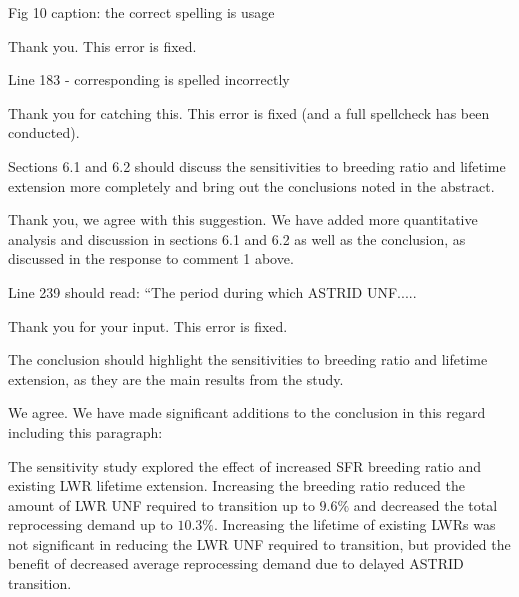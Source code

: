 \documentclass[answers,11pt]{exam}
\begin{document}
\begin{questions}
        \question Fig 10 caption: the correct spelling is usage

        \begin{solution}
                Thank you. This error is fixed.
        \end{solution}

        \question Line 183 - corresponding is spelled incorrectly
        \begin{solution}
                Thank you for catching this. This error is fixed 
                (and a full spellcheck has been conducted).
        \end{solution}

        \question Sections 6.1 and 6.2 should discuss the sensitivities to 
        breeding ratio and lifetime extension more completely and bring out the 
        conclusions noted in the abstract.

        \begin{solution}
                Thank you, we agree with this suggestion. We have added more quantitative
		analysis and discussion in sections 6.1 and 6.2 as well as the
		conclusion, as discussed in the response to comment 1 above.
        \end{solution}

        \question Line 239 should read: ``The period during which ASTRID UNF.....
        \begin{solution}
                Thank you for your input. This error is fixed.
        \end{solution}

        \question The conclusion should highlight the sensitivities to breeding 
        ratio and lifetime extension, as they are the main results from the 
        study.  

        \begin{solution}
                We agree. We have made significant additions to the conclusion 
                in this regard including this paragraph:


The sensitivity study explored the effect of increased \gls{SFR} breeding
ratio and existing \gls{LWR} lifetime extension. Increasing the breeding
ratio reduced the amount of \gls{LWR} \gls{UNF} required to transition
up to $9.6\%$ and decreased the total reprocessing demand up to $10.3\%$.
Increasing the lifetime of existing \glspl{LWR} was not significant
in reducing the \gls{LWR} \gls{UNF} required to transition, but provided the benefit of
decreased average reprocessing demand due to delayed \gls{ASTRID} transition.


\end{solution}
\end{questions}
\end{document}
